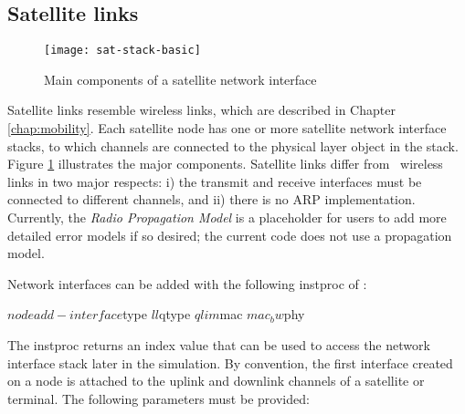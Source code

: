 
\subsection{Satellite links}
\label{sec:satellite/usage/links}

\begin{figure}
    \centerline{\texttt{[image: sat-stack-basic]}}
    \caption{Main components of a satellite network interface}
    \label{fig:sat-stack-basic}
\end{figure}

Satellite links resemble wireless links, which are described in Chapter
\ref{chap:mobility}.  Each satellite
node has one or more satellite network interface stacks, to which
channels are connected to the physical layer object in the stack.  Figure
\ref{fig:sat-stack-basic} illustrates the major components.  Satellite
links differ from \ns~wireless links in two major respects:  i) the
transmit and receive interfaces must be connected to different channels,
and ii) there is no ARP implementation.  Currently, the {\em
Radio Propagation Model} is a placeholder for users to add more detailed
error models if so desired; the current code does not use a propagation
model.

Network interfaces can be added with the following instproc of
:
\begin{program}
$node add-interface $type $ll $qtype $qlim $mac $mac_bw $phy
\end{program}
The  instproc returns an index value that can be used
to access the network interface stack later in the simulation.  By convention,
the first interface created on a node is attached to the uplink and downlink
channels of a satellite or terminal.  The
following parameters must be provided:

